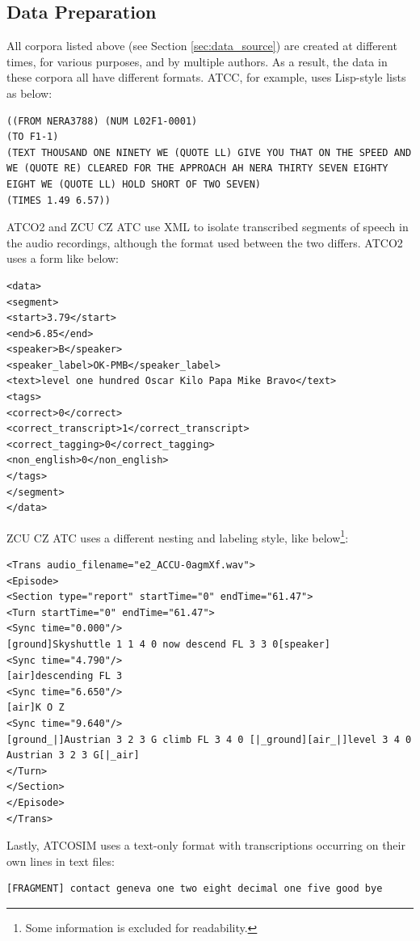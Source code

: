 \documentclass[12pt]{article}
\begin{document}
\subsection{Data Preparation}\label{sec:data_preparation}
All corpora listed above (see Section \ref{sec:data_source}) are created at different times, for various purposes, and by multiple authors. As a
result, the data in these corpora all have different formats. ATCC, for example, uses Lisp-style lists as below:

\begin{lstlisting}
((FROM NERA3788) (NUM L02F1-0001)
(TO F1-1)
(TEXT THOUSAND ONE NINETY WE (QUOTE LL) GIVE YOU THAT ON THE SPEED AND WE (QUOTE RE) CLEARED FOR THE APPROACH AH NERA THIRTY SEVEN EIGHTY EIGHT WE (QUOTE LL) HOLD SHORT OF TWO SEVEN)
(TIMES 1.49 6.57))
\end{lstlisting}

ATCO2 and ZCU CZ ATC use XML to isolate transcribed segments of speech in the audio recordings, although the format used between the two differs.
ATCO2 uses a form like below:

\begin{lstlisting}
<data>
<segment>
<start>3.79</start>
<end>6.85</end>
<speaker>B</speaker>
<speaker_label>OK-PMB</speaker_label>
<text>level one hundred Oscar Kilo Papa Mike Bravo</text>
<tags>
<correct>0</correct>
<correct_transcript>1</correct_transcript>
<correct_tagging>0</correct_tagging>
<non_english>0</non_english>
</tags>
</segment>
</data>
\end{lstlisting}

ZCU CZ ATC uses a different nesting and labeling style, like below\footnote{Some information is excluded for readability.}:

\begin{lstlisting}
<Trans audio_filename="e2_ACCU-0agmXf.wav">
<Episode>
<Section type="report" startTime="0" endTime="61.47">
<Turn startTime="0" endTime="61.47">
<Sync time="0.000"/>
[ground]Skyshuttle 1 1 4 0 now descend FL 3 3 0[speaker]
<Sync time="4.790"/>
[air]descending FL 3
<Sync time="6.650"/>
[air]K O Z
<Sync time="9.640"/>
[ground_|]Austrian 3 2 3 G climb FL 3 4 0 [|_ground][air_|]level 3 4 0 Austrian 3 2 3 G[|_air]
</Turn>
</Section>
</Episode>
</Trans>
\end{lstlisting}

Lastly, ATCOSIM uses a text-only format with transcriptions occurring on their own lines in text files:

\begin{lstlisting}
[FRAGMENT] contact geneva one two eight decimal one five good bye
\end{lstlisting}
\end{document}
